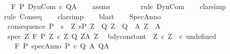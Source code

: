 \begin{isabellebody}
\ \ \ {\isachardoublequoteopen}{\isasymGamma}{\isacharcomma}{\isasymTheta}{\isasymturnstile}\isactrlbsub {\isacharslash}F\ \isactrlesub P\ DynCom\ c\ Q{\isacharcomma}A{\isachardoublequoteclose}\isanewline
%
\isadelimproof
\ \ %
\endisadelimproof
%
\isatagproof
{}\isamarkupfalse%
\ assms\isanewline
\ \ \isamarkupfalse%
\ {\isacharminus}\isanewline
\ \ \isamarkupfalse%
\ {\isacharparenleft}rule\ DynCom{\isacharparenright}\isanewline
\ \ \isamarkupfalse%
\ clarsimp\isanewline
\ \ \isamarkupfalse%
\ {\isacharparenleft}rule\ Conseq{\isacharparenright}\isanewline
\ \ \isamarkupfalse%
\ clarsimp\isanewline
\ \ \isamarkupfalse%
\ blast\isanewline
\ \ \isamarkupfalse%
%
\endisatagproof
{\isafoldproof}%
%
\isadelimproof
\isanewline
%
\endisadelimproof
\isanewline
{}\isamarkupfalse%
\ SpecAnno{\isacharcolon}\ \isanewline
\ \ consequence{\isacharcolon}\ {\isachardoublequoteopen}P\ {\isasymsubseteq}\ {\isacharbraceleft}s{\isachardot}\ {\isacharparenleft}{\isasymexists}\ Z{\isachardot}\ s{\isasymin}P{\isacharprime}\ Z\ {\isasymand}\ {\isacharparenleft}Q{\isacharprime}\ Z\ {\isasymsubseteq}\ Q{\isacharparenright}\ {\isasymand}\ {\isacharparenleft}A{\isacharprime}\ Z\ {\isasymsubseteq}\ A{\isacharparenright}{\isacharparenright}{\isacharbraceright}{\isachardoublequoteclose}\isanewline
\ \ spec{\isacharcolon}\ {\isachardoublequoteopen}{\isasymforall}Z{\isachardot}\ {\isasymGamma}{\isacharcomma}{\isasymTheta}{\isasymturnstile}\isactrlbsub {\isacharslash}F\isactrlesub \ {\isacharparenleft}P{\isacharprime}\ Z{\isacharparenright}\ {\isacharparenleft}c\ Z{\isacharparenright}\ {\isacharparenleft}Q{\isacharprime}\ Z{\isacharparenright}{\isacharcomma}{\isacharparenleft}A{\isacharprime}\ Z{\isacharparenright}{\isachardoublequoteclose}\isanewline
\ \ bdy{\isacharunderscore}constant{\isacharcolon}\ \ {\isachardoublequoteopen}{\isasymforall}Z{\isachardot}\ c\ Z\ {\isacharequal}\ c\ undefined{\isachardoublequoteclose}\isanewline
\ \ \ \ {\isachardoublequoteopen}{\isasymGamma}{\isacharcomma}{\isasymTheta}{\isasymturnstile}\isactrlbsub {\isacharslash}F\isactrlesub \ P\ {\isacharparenleft}specAnno\ P{\isacharprime}\ c\ Q{\isacharprime}\ A{\isacharprime}{\isacharparenright}\ Q{\isacharcomma}A{\isachardoublequoteclose}\isanewline
%
\isadelimproof
%
\endisadelimproof
%
\isatagproof
{}\isamarkupfalse%
\ {\isacharminus}\isanewline

\end{isabellebody}

